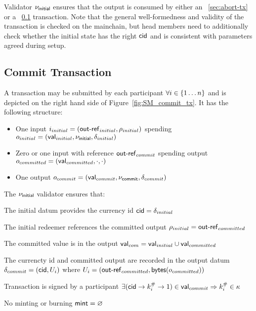\noindent Validator $\nu_\mathsf{initial}$ ensures that the output is consumed by either
an \mtxAbort{}~\ref{sec:abort-tx} or a \mtxCom{}~\ref{sec:commit-tx}
transaction. Note that the general well-formedness and validity of the
\mtxInit{} transaction is checked on the mainchain, but head members need to
additionally check whether the initial state has the right $\mathsf{cid}$ and is
consistent with parameters agreed during setup.



\subsection{Commit Transaction}\label{sec:commit-tx}

A \mtxCom{} transaction may be submitted by each participant
$\forall i \in \{1 \dots n\}$ and is depicted on the right hand side of
Figure~\ref{fig:SM_commit_tx}. It has the following structure:
\begin{itemize}
  \item One input $i_{initial} = (\mathsf{out\textsf{-}{}ref}_{initial}, \rho_{initial})$
        spending $o_{initial} = (\mathsf{val}_{initial}, \nu_\mathsf{initial}, \delta_{initial})$
  \item Zero or one input with reference $\mathsf{out\textsf{-}{}ref}_{commit}$ spending output
        $o_{committed} = (\mathsf{val}_{committed}, \cdot , \cdot)$
  \item One output $o_{commit} = (\mathsf{val}_{commit}, \nu_\mathsf{commit}, \delta_{commit})$
\end{itemize}

\noindent The $\nu_\mathsf{initial}$ validator ensures that:
\begin{menumerate}
  \item The initial datum provides the currency id $\mathsf{cid} = \delta_{initial}$
  \item The initial redeemer references the committed output $\rho_{initial} = \mathsf{out\textsf{-}{}ref}_{committed}$
  \item The committed value is in the output $\mathsf{val}_{com} = \mathsf{val}_{initial} \cup \mathsf{val}_{committed}$
  \item The currencty id and committed output are recorded in the output datum
  $\delta_{commit} = (\mathsf{cid}, U_{i})$ where
  $U_{i} = (\mathsf{out\textsf{-}{}ref}_{committed},\mathsf{bytes}(o_{committed}))$
  \item Transaction is signed by a participant $\exists (\mathsf{cid} \rightarrow k^{\#}_{i} \rightarrow 1) \in \mathsf{val}_{commit} \Rightarrow k^{\#}_{i} \in \kappa$
  \item No minting or burning  $\mathsf{mint} = \varnothing$
\end{menumerate}

